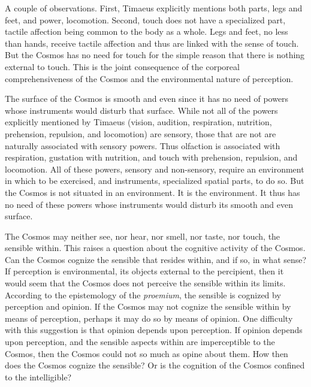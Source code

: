 A couple of observations. First, Timaeus explicitly mentions both parts, legs and feet, and power, locomotion. Second, touch does not have a specialized part, tactile affection being common to the body as a whole. Legs and feet, no less than hands, receive tactile affection and thus are linked with the sense of touch. But the Cosmos has no need for touch for the simple reason that there is nothing external to touch. This is the joint consequence of the corporeal comprehensiveness of the Cosmos and the environmental nature of perception.

\vspace{\baselineskip} 

\noindent The surface of the Cosmos is smooth and even since it has no need of powers whose instruments would disturb that surface. While not all of the powers explicitly mentioned by Timaeus (vision, audition, respiration, nutrition, prehension, repulsion, and locomotion) are sensory, those that are not are naturally associated with sensory powers. Thus olfaction is associated with respiration, gustation with nutrition, and touch with prehension, repulsion, and locomotion. All of these powers, sensory and non-sensory, require an environment in which to be exercised, and instruments, specialized spatial parts, to do so. But the Cosmos is not situated in an environment. It is the environment. It thus has no need of these powers whose instruments would disturb its smooth and even surface.

The Cosmos may neither see, nor hear, nor smell, nor taste, nor touch, the sensible within. This raises a question about the cognitive activity of the Cosmos. Can the Cosmos cognize the sensible that resides within, and if so, in what sense? If perception is environmental, its objects external to the percipient, then it would seem that the Cosmos does not perceive the sensible within its limits. According to the epistemology of the \emph{proemium}, the sensible is cognized by perception and opinion. If the Cosmos may not cognize the sensible within by means of perception, perhaps it may do so by means of opinion. One difficulty with this suggestion is that opinion depends upon perception. If opinion depends upon perception, and the sensible aspects within are imperceptible to the Cosmos, then the Cosmos could not so much as opine about them. How then does the Cosmos cognize the sensible? Or is the cognition of the Cosmos confined to the intelligible?

